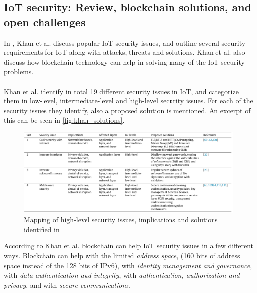 \documentclass[a4paper,10pt]{article}
\begin{document}
\subsection{IoT security: Review, blockchain solutions, and open challenges} \label{sec:literature_review:khan2018}
In \cite{Khan2018}, Khan et al. discuss popular IoT security issues, and outline several security requirements for IoT along
with attacks, threats and solutions. Khan et al. also discuss how blockchain technology can help in solving many of the 
IoT security problems. 
\\\\
Khan et al. identify in total 19 different security issues in IoT, and categorize them in low-level, intermediate-level and 
high-level security issues. For each of the security issues they identify, also a proposed solution is mentioned. An excerpt
of this can be seen in \autoref{fig:khan_solutions}.

\begin{figure}[hbtp]
 \centering
 \includegraphics[width=\linewidth]{khan.png}
 \caption{Mapping of high-level security issues, implications and solutions identified in \cite{Khan2018}}
 \label{fig:khan_solutions}
\end{figure}

According to Khan et al. blockchain can help IoT security issues in a few different ways. Blockchain can help with the 
limited \textit{address space}, (160 bits of address space instead of the 128 bits of IPv6), with \textit{ identity management 
and governance}, with \textit{data authentication and integrity}, with \textit{authentication, authorization and privacy}, 
and with \textit{secure communications}.
\end{document}
